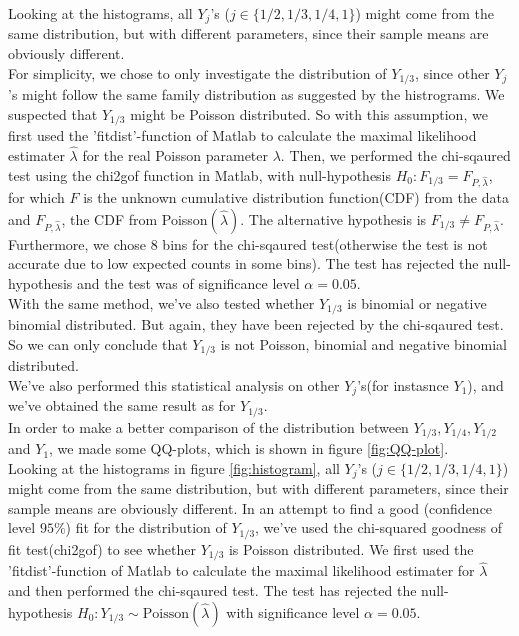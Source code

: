 Looking at the histograms, all $Y_j$'s ($j\in \{1/2,1/3,1/4,1\}$) might come from the same distribution, but with different parameters, since their sample means are obviously different.\\

For simplicity, we chose to only investigate the distribution of $Y_{1/3}$, since other $Y_j$'s might follow the same family distribution as suggested by the histrograms. We suspected that $Y_{1/3}$ might be Poisson distributed. So with this assumption, we first used the 'fitdist'-function of Matlab to calculate the maximal likelihood estimater $\hat{\lambda}$ for the real Poisson parameter $\lambda$. Then, we performed the chi-sqaured test using the chi2gof function in Matlab, with null-hypothesis $H_0:F_{1/3}=F_{P,\hat{\lambda}}$, for which $F$ is the unknown cumulative distribution function(CDF) from the data and $F_{P,\hat{\lambda}}$, the CDF from Poisson$(\hat{\lambda})$. The alternative hypothesis is $F_{1/3}\neq F_{P,\hat{\lambda}}$. Furthermore, we chose 8 bins for the chi-sqaured test(otherwise the test is not accurate due to low expected counts in some bins). The test has rejected the null-hypothesis and the test was of significance level $\alpha=0.05$. \\   

With the same method, we've also tested whether $Y_{1/3}$ is binomial or negative binomial distributed. But again, they have been rejected by the chi-sqaured test. So we can only conclude that $Y_{1/3}$ is not Poisson, binomial and negative binomial distributed.\\
We've also performed this statistical analysis on other $Y_j$'s(for instasnce $Y_1$), and we've obtained the same result as for $Y_{1/3}$.\\

In order to make a better comparison of the distribution between $Y_{1/3},Y_{1/4},Y_{1/2}$ and $Y_1$, we made some QQ-plots, which is shown in figure \ref{fig:QQ-plot}.\\ 

Looking at the histograms in figure \ref{fig:histogram}, all $Y_j$'s ($j\in \{1/2,1/3,1/4,1\}$) might come from the same distribution, but with different parameters, since their sample means are obviously different.
In an attempt to find a good (confidence level $95\%$) fit for the distribution of $Y_{1/3}$, we've used the chi-squared goodness of fit test(chi2gof) to see whether $Y_{1/3}$ is Poisson distributed. 
We first used the 'fitdist'-function of Matlab to calculate the maximal likelihood estimater for $\hat{\lambda}$ and then performed the chi-sqaured test. 
The test has rejected the null-hypothesis $H_0:Y_{1/3}\sim\text{Poisson}(\hat{\lambda})$ with significance level $\alpha=0.05$.\\   

